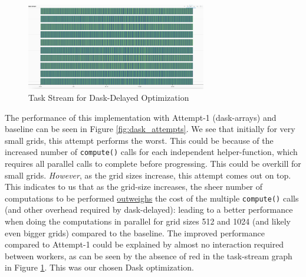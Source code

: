 \documentclass[a4paper,10pt]{article}
\begin{document}
\begin{figure}[h]
  \centering
  \includegraphics[width=0.7\textwidth]{images/dask/dask_opt2.png}
  \caption{Task Stream for Dask-Delayed Optimization}
  \label{fig:dask_opt2_stream}
\end{figure}

The performance of this implementation with Attempt-1 (dask-arrays) and baseline can be seen in Figure \ref{fig:dask_attempts}. We see that initially for very small grids, this attempt performs the worst. This could be because of the increased number of \verb|compute()| calls for each independent helper-function, which requires all parallel calls to complete before progressing. This could be overkill for small grids. \textit{However}, as the grid sizes increase, this attempt comes out on top. This indicates to us that as the grid-size increases, the sheer number of computations to be performed \underline{outweighs} the cost of the multiple \verb|compute()| calls (and other overhead required by dask-delayed): leading to a better performance when doing the computations in parallel for grid sizes 512 and 1024 (and likely even bigger grids) compared to the baseline. The improved performance compared to Attempt-1 could be explained by almost no interaction required between workers, as can be seen by the absence of red in the task-stream graph in Figure \ref{fig:dask_opt2_stream}. This was our chosen Dask optimization. 
\end{document}
